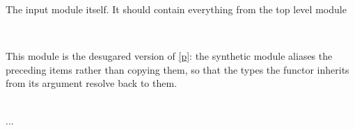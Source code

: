\begin{ocamlindent}
\medbreak
\label{Oxcaml-Include_functor_argument_shapes--module-Aliased}\begin{ocamlindent}The input module itself. It should contain everything from the top level module\end{ocamlindent}%
\medbreak
\end{ocamlindent}%
\\
\label{Oxcaml--module-Include_functor_desugared}\label{Oxcaml-Include_functor_desugared}\begin{ocamlindent}\label{Oxcaml-Include_functor_desugared--module-Make}\begin{ocamlindent}This module is the desugared version of \hyperref[Oxcaml-Include_functor]{[p\pageref*{Oxcaml-Include_functor}]}: the synthetic module aliases the preceding items rather than copying them, so that the types the functor inherits from its argument resolve back to them.\end{ocamlindent}%
\medbreak
\label{Oxcaml-Include_functor_desugared--type-t}\\
  .\allowbreak{}.\allowbreak{}.\allowbreak{} \label{Oxcaml-Include_functor_desugared--type-included}\\
\end{ocamlindent}%
\\
